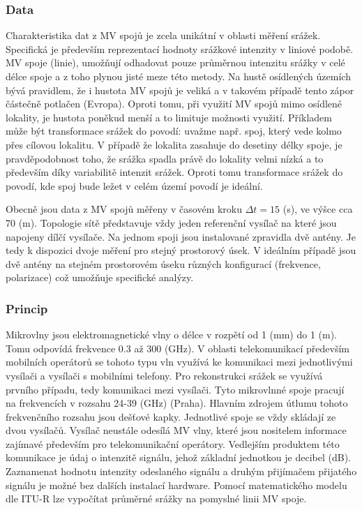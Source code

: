 \documentclass[a4paper,12pt,oneside]{report}
\begin{document}
\subsubsection{Data}
Charakteristika dat z MV spojů je zcela unikátní v oblasti měření
srážek. Specifická je především reprezentací hodnoty srážkové
intenzity v liniové podobě. MV spoje (linie), umožňují odhadovat pouze
průměrnou intenzitu srážky v celé délce spoje a z toho plynou jisté
meze této metody. Na hustě osídlených územích bývá pravidlem, že i
hustota MV spojů je veliká a v takovém případě tento zápor částečně
potlačen (Evropa). Oproti tomu, při využití MV spojů mimo osídlené
lokality, je hustota poněkud menší a to limituje možnosti
využití. Příkladem může být transformace srážek do povodí: uvažme např.
spoj, který vede kolmo přes cílovou lokalitu. V případě že lokalita
zasahuje do desetiny délky spoje, je pravděpodobnost toho, že srážka
spadla právě do lokality velmi nízká a to především díky
variabilitě intenzit srážek. Oproti tomu transformace srážek do povodí,
kde spoj bude ležet v celém území povodí je ideální.

Obecně jsou data z MV spojů měřeny v časovém kroku $\Delta t=15$ (s),
ve výšce cca 70 (m). Topologie sítě představuje vždy jeden
referenční vysílač na které jsou napojeny dílčí vysílače. Na jednom
spoji jsou instalované zpravidla dvě antény. Je tedy k dispozici
dvoje měření pro stejný prostorový úsek. V ideálním případě jsou dvě
antény na stejném prostorovém úseku různých konfigurací (frekvence,
polarizace) což umožňuje specifické analýzy.

    
\subsubsection{Princip}
Mikrovlny jsou elektromagnetické vlny o délce v rozpětí od 1 (mm) do 1
(m). Tomu odpovídá frekvence 0.3 až 300 (GHz). V oblasti
telekomunikací především mobilních operátorů se tohoto typu vln
využívá ke komunikaci mezi jednotlivými vysílači a vysílači s
mobilními telefony. Pro rekonstrukci srážek se využívá prvního
případu, tedy komunikaci mezi vysílači. Tyto mikrovlnné spoje pracují
na frekvencích v rozsahu 24-39 (GHz) (Praha). Hlavním zdrojem útlumu
tohoto frekvenčního rozsahu jsou dešťové kapky. Jednotlivé spoje se
vždy skládají ze dvou vysílačů. Vysílač neustále odesílá MV vlny,
které jsou nositelem informace zajímavé především pro telekomunikační
operátory. Vedlejším produktem této komunikace je údaj o intenzitě
signálu, jehož základní jednotkou je decibel (dB). Zaznamenat hodnotu
intenzity odeslaného signálu a druhým přijímačem přijatého signálu je
možné bez dalších instalací hardware. Pomocí matematického
modelu dle ITU-R\cite{itu} lze vypočítat průměrné srážky na pomyslné
linii MV spoje.
\end{document}
